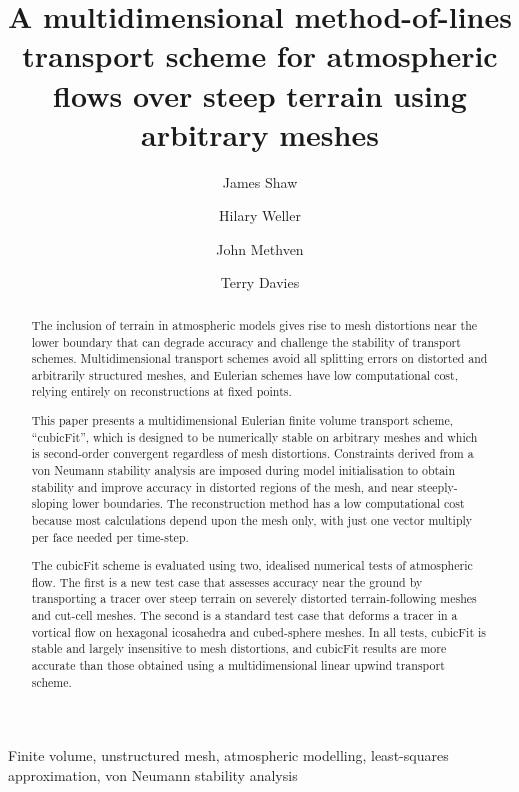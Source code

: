 \documentclass[times]{elsarticle}
\begin{document}
\begin{frontmatter}
\title{A multidimensional method-of-lines transport scheme for atmospheric flows over steep terrain using arbitrary meshes}
\author[uor]{James Shaw}
\author[uor]{Hilary Weller}
\author[uor]{John Methven}
\author[mo]{Terry Davies}

\address[uor]{Department of Meteorology, University of Reading, Reading, United Kingdom}
\address[mo]{Met Office, Exeter, United Kingdom}

\begin{abstract}
The inclusion of terrain in atmospheric models gives rise to mesh distortions near the lower boundary that can degrade accuracy and challenge the stability of transport schemes.
Multidimensional transport schemes avoid all splitting errors on distorted and arbitrarily structured meshes, and Eulerian schemes have low computational cost, relying entirely on reconstructions at fixed points.

This paper presents a multidimensional Eulerian finite volume transport scheme, ``cubicFit'', which is designed to be numerically stable on arbitrary meshes and which is second-order convergent regardless of mesh distortions.
Constraints derived from a von Neumann stability analysis are imposed during model initialisation to obtain stability and improve accuracy in distorted regions of the mesh, and near steeply-sloping lower boundaries.
The reconstruction method has a low computational cost because most calculations depend upon the mesh only, with just one vector multiply per face needed per time-step.

The cubicFit scheme is evaluated using two, idealised numerical tests of atmospheric flow.  The first is a new test case that assesses accuracy near the ground by transporting a tracer over steep terrain on severely distorted terrain-following meshes and cut-cell meshes.
The second is a standard test case that deforms a tracer in a vortical flow on hexagonal icosahedra and cubed-sphere meshes.
In all tests, cubicFit is stable and largely insensitive to mesh distortions, and cubicFit results are more accurate than those obtained using a multidimensional linear upwind transport scheme.
\end{abstract}

\begin{keyword}
	Finite volume, unstructured mesh, atmospheric modelling, least-squares approximation, von Neumann stability analysis
\end{keyword}
\end{frontmatter}
\end{document}
